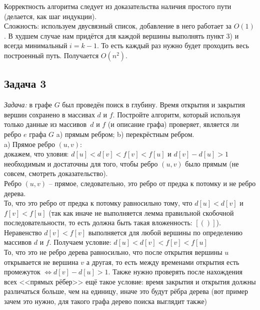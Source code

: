 \documentclass[a4paper,12pt]{article} %
\begin{document}
Корректность алгоритма следует из доказательства наличия простого пути (делается, как шаг индукции).\\

Сложность: используем двусвязный список, добавление в него работает за $ O(1) $. В худшем случае нам придётся для каждой вершины выполнять пункт 3) и всегда минимальный $ i = k - 1$. То есть каждый раз нужно будет проходить весь построенный путь. Получается $ O(n^2) $. 


\subsection*{Задача 3}
\textit{Задача:} в графе $G$ был проведён поиск в глубину. Время открытия и закрытия вершин сохранено в массивах $d$ и $f$. Постройте алгоритм, который используя только данные из массивов~$d$ и $f$ (и описание графа) проверяет, является ли ребро $e$ графа $G$ a) прямым ребром; b) перекрёстным ребром.\\
 
a) Прямое ребро $(u,v)$:\\ 
докажем, что уловия: $ d[u]<d[v]<f[v]<f[u] $ и $ d[v] - d[u] > 1 $ необходимым и достаточны для того, чтобы ребро $(u,v)$ было прямым (не совсем, смотреть доказательство).\\

Ребро $(u,v)$ -- прямое, следовательно, это ребро от предка к потомку и не ребро дерева. \\

То, что это ребро от предка к потомку равносильно тому, что $ d[u] < d[v] $ и $ f[v] < f[u] $ (так как иначе не выполняется лемма правильной скобочной последовательности, то есть должна быть такая вложенность: $ [ ( ) ] $). Неравенство $ d[v] < f[v] $ выполняется для любой вершины по определению массивов $ d $ и $ f $. Получаем условие: $ d[u]<d[v]<f[v]<f[u] $\\

То, что это не ребро дерева равносильно, что после открытия вершины $ u $ открывается не вершина $ v $ а другая, то есть между временами открытия есть промежуток $ \Leftrightarrow d[v] - d[u] > 1 $. Также нужно проверять после нахождения всех <<прямых рёбер>> ещё такое условие: время закрытия и открытия должны различаться больше, чем на единицу, иначе это будут рёбра дерева (вот пример зачем это нужно, для такого графа дерево поиска выглядит также)
\end{document}
